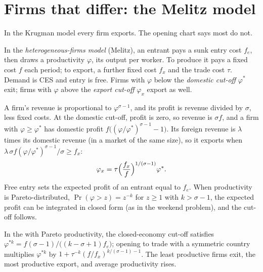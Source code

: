 \section{Firms that differ: the Melitz model}\label{sec:b3:scale-variety-firms:melitz}

In the Krugman model every firm exports. The opening chart says most do not.

\begin{definition}\label{def:b3:scale-variety-firms:melitz}
In the \emph{heterogeneous-firms model} (Melitz), an entrant pays a sunk entry
cost $f_e$, then draws a productivity $\varphi$, its output per worker. To produce
it pays a fixed cost $f$ each period; to export, a further fixed cost $f_x$ and the
trade cost $\tau$. Demand is CES and entry is free. Firms with $\varphi$ below the
\emph{domestic cut-off} $\varphi^*$ exit; firms with $\varphi$ above the \emph{export
cut-off} $\varphi_x$ export as well.
\end{definition}

A firm's revenue is proportional to $\varphi^{\sigma-1}$, and its profit is revenue
divided by $\sigma$, less fixed costs. At the domestic cut-off, profit is zero, so
revenue is $\sigma f$, and a firm with $\varphi \ge \varphi^*$ has domestic profit $f\bigl((\varphi/\varphi^*)^{\sigma-1}
- 1\bigr)$. Its foreign revenue is $\lambda$ times its domestic revenue (in a market
of the same size), so it exports when $\lambda\, \sigma f(\varphi/\varphi^*)^{\sigma-1}/\sigma
\ge f_x$:
\begin{equation}\label{eq:b3:sv:export-cutoff}
  \varphi_x = \tau \Bigl(\frac{f_x}{f}\Bigr)^{1/(\sigma-1)} \varphi^* .
\end{equation}
Free entry sets the expected profit of an entrant equal to $f_e$. When
productivity is Pareto-distributed, $\Pr(\varphi > z) = z^{-k}$ for $z \ge 1$ with $k > \sigma
- 1$, the expected profit can be integrated in closed form (as in the weekend
problem), and the cut-off follows.

\begin{proposition}\label{prop:b3:scale-variety-firms:cutoff}
In the  with Pareto productivity, the closed-economy
cut-off satisfies $\varphi^{*k} = f(\sigma - 1)/\bigl((k - \sigma + 1)f_e\bigr)$; opening to
trade with a symmetric country multiplies $\varphi^{*k}$ by $1 + \tau^{-k}(f/f_x)^{k/(\sigma-1) -
1}$. The least productive firms exit, the most productive export, and average
productivity rises.
\end{proposition}
\admitted

